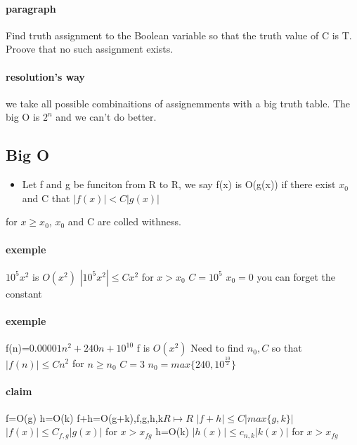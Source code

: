 \documentclass[a4paper,10pt]{article}
\begin{document}
{\paragraph{paragraph}
Find truth assignment to the Boolean variable so that the truth value of C is T. Proove that no such assignment exists.
\paragraph{resolution's way}
we take all possible combinaitions of assignemments with a big truth table. The big O is $2^n$ and we can't do better.
\subsection{Big O}
\begin{itemize}
 \item Let f and g be funciton from R to R, we say f(x) is O(g(x)) if there exist $x_0$ and C that $|f(x)|<C|g(x)|$
\end{itemize}
for $x\geq x_0$, $x_0$ and C are colled withness.
\paragraph{exemple}
$10^5x^2$ is $O(x^2)$ 
\newline
$|10^5x^2|\leq Cx^2$ for $x>x_0$
\newline
$C=10^5$
\newline
$x_0=0$
\newline
you can forget the constant
\paragraph{exemple}
f(n)=$0.00001n^2+240n+10^{10}$
\newline
f is $O(x^2)$
\newline
Need to find $n_0,C$ so that $|f(n)|\leq Cn^2$ for $n\geq n_0$
\newline
$C=3$
\newline
$n_0=max\{240,10^{\frac{10}{2}}\}$
\paragraph{claim}
f=O(g)
\newline
h=O(k)
\newline
f+h=O(g+k),f,g,h,k$R\mapsto R$
\newline
$|f+h|\leq C|max\{g,k\}|$
\newline
$|f(x)|\leq C_{f,g}|g(x)|$ for $x>x_{fg}$
\newline
h=O(k)
\newline
$|h(x)|\leq c_{n,k}|k(x)|$ for $x>x_{fg}$
}
\end{document}
